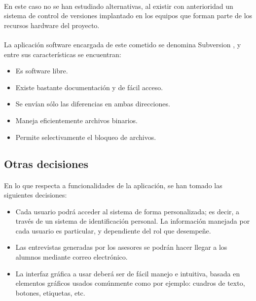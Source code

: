    \paragraph{}En este caso no se han estudiado alternativas, al existir con
   anterioridad un sistema de control de versiones implantado en los equipos
   que forman parte de los recursos hardware del proyecto.

   \paragraph{}La aplicación software encargada de este cometido se denomina
   Subversion \cite{subversion}, y entre sus características se encuentran:
   \begin{itemize}
      \item Es software libre.
      \item Existe bastante documentación y de fácil acceso.
      \item Se envían sólo las diferencias en ambas direcciones.
      \item Maneja eficientemente archivos binarios.
      \item Permite selectivamente el bloqueo de archivos.
   \end{itemize}

\subsection{Otras decisiones}

\paragraph{}En lo que respecta a funcionalidades de la aplicación, se han tomado
las siguientes decisiones:

\begin{itemize}
   \item Cada usuario podrá acceder al sistema de forma personalizada; es decir,
   a través de un sistema de identificación personal. La información manejada
   por cada usuario es particular, y dependiente del rol que desempeñe.
   \item Las entrevistas generadas por los asesores se podrán hacer llegar a los
   alumnos mediante correo electrónico.
   \item La interfaz gráfica a usar deberá ser de fácil manejo e intuitiva,
   basada en elementos gráficos usados comúnmente como por ejemplo: cuadros de
   texto, botones, etiquetas, etc.
\end{itemize}

